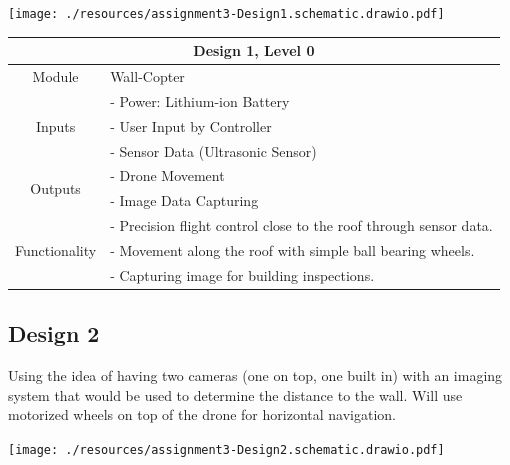 \documentclass[12pt]{article}
\begin{document}
            \vspace{0.5in}
            \centerline{\texttt{[image: ./resources/assignment3-Design1.schematic.drawio.pdf]}}

            \vspace{0.5in}
            \begin{tabular}{|c|l|}
                \hline
                \multicolumn{2}{|c|}{\textbf{Design 1, Level 0}} \\\hline
                Module & Wall-Copter \\\hline
                \multirow{3}{3cm}{Inputs}
                    & - Power: Lithium-ion Battery\\
                    & - User Input by Controller \\
                    & - Sensor Data (Ultrasonic Sensor) \\
                    \hline
                \multirow{2}{3cm}{Outputs}
                    & - Drone Movement \\
                    & - Image Data Capturing \\
                    \hline
                \multirow{3}{3cm}{Functionality}
                    & - Precision flight control close to the roof through sensor data. \\
                    & - Movement along the roof with simple ball bearing wheels. \\
                    & - Capturing image for building inspections. \\
                    \hline
                
            \end{tabular}
            
        \newpage
        \subsection{Design 2}
            Using the idea of having two cameras (one on top, one built in) with an imaging system that would be used to determine the distance to the wall.
            Will use motorized wheels on top of the drone for horizontal navigation.
            
            \vspace{0.5in}
            \centerline{\texttt{[image: ./resources/assignment3-Design2.schematic.drawio.pdf]}}
\end{document}
